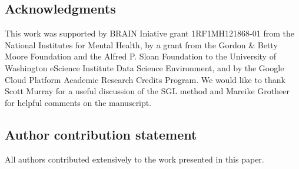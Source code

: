 \documentclass[10pt,%
               aps,%
               prl,%
               reprint,%
               superscriptaddress,%
               preprintnumbers,%
               linenumbers,%
               amsmath,%
               floatfix]{revtex4-1}
\begin{document}
\subsection*{Acknowledgments}

This work was supported by BRAIN Iniative grant 1RF1MH121868-01 from the
National Institutes for Mental Health, by a grant from the Gordon \& Betty
Moore Foundation and the Alfred P. Sloan Foundation to the University of
Washington eScience Institute Data Science Environment, and by the Google
Cloud Platform Academic Research Credits Program. We would like to thank
Scott Murray for a useful discussion of the SGL method and Mareike Grotheer
for helpful comments on the manuscript.

\subsection*{Author contribution statement}

All authors contributed extensively to the work presented in this paper.



\end{document}

